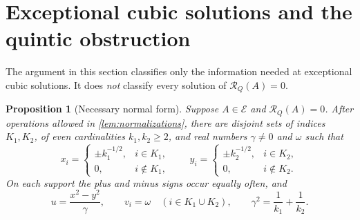\documentclass[11pt,reqno]{amsart}
\newtheorem{proposition}[proposition]{Proposition}
\theoremstyle{definition}
\theoremstyle{remark}
\numberwithin{equation}{section}
\newcommand{\Exc}{\mathcal E}
\begin{document}
\section{Exceptional cubic solutions and the quintic obstruction}
\label{sec:exceptional}

The argument in this section classifies only the information needed
at exceptional cubic solutions. It does \emph{not} classify every
solution of $\mathcal R_Q(A)=0$.

\begin{proposition}[Necessary normal form]\label{prop:normal-form}
Suppose $A\in\Exc$ and $\mathcal R_Q(A)=0$. After operations allowed
in \cref{lem:normalizations}, there are disjoint sets of indices
$K_1,K_2$, of even cardinalities $k_1,k_2\geq2$, and real numbers
$\gamma\ne0$ and $\omega$ such that
\begin{equation}\label{eq:normal-supports}
 x_i=\begin{cases}\pm k_1^{-1/2},&i\in K_1,\\0,&i\notin K_1,
       \end{cases}
 \qquad
 y_i=\begin{cases}\pm k_2^{-1/2},&i\in K_2,\\0,&i\notin K_2.
       \end{cases}
\end{equation}
On each support the plus and minus signs occur equally often, and
\begin{equation}\label{eq:normal-uv}
 u=\frac{x^2-y^2}{\gamma},\qquad
 v_i=\omega\quad(i\in K_1\cup K_2),\qquad
 \gamma^2=\frac1{k_1}+\frac1{k_2}.
\end{equation}
\end{proposition}
\end{document}
